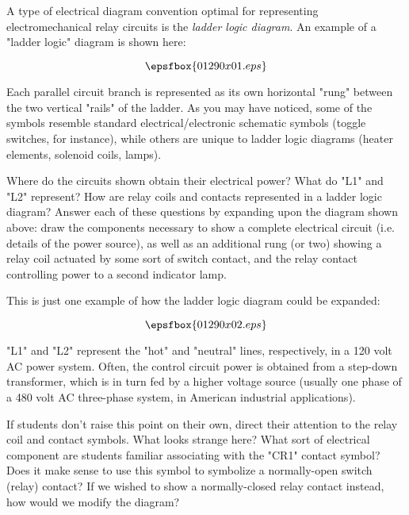 

A type of electrical diagram convention optimal for representing electromechanical relay circuits is the {\it ladder logic diagram}.  An example of a "ladder logic" diagram is shown here:

\vskip 20pt

$$\epsfbox{01290x01.eps}$$

\vskip 40pt

Each parallel circuit branch is represented as its own horizontal "rung" between the two vertical "rails" of the ladder.  As you may have noticed, some of the symbols resemble standard electrical/electronic schematic symbols (toggle switches, for instance), while others are unique to ladder logic diagrams (heater elements, solenoid coils, lamps).

Where do the circuits shown obtain their electrical power?  What do "L1" and "L2" represent?  How are relay coils and contacts represented in a ladder logic diagram?  Answer each of these questions by expanding upon the diagram shown above: draw the components necessary to show a complete electrical circuit (i.e. details of the power source), as well as an additional rung (or two) showing a relay coil actuated by some sort of switch contact, and the relay contact controlling power to a second indicator lamp.







This is just one example of how the ladder logic diagram could be expanded:

$$\epsfbox{01290x02.eps}$$

"L1" and "L2" represent the "hot" and "neutral" lines, respectively, in a 120 volt AC power system.  Often, the control circuit power is obtained from a step-down transformer, which is in turn fed by a higher voltage source (usually one phase of a 480 volt AC three-phase system, in American industrial applications).







If students don't raise this point on their own, direct their attention to the relay coil and contact symbols.  What looks strange here?  What sort of electrical component are students familiar associating with the "CR1" contact symbol?  Does it make sense to use this symbol to symbolize a normally-open switch (relay) contact?  If we wished to show a normally-closed relay contact instead, how would we modify the diagram?




